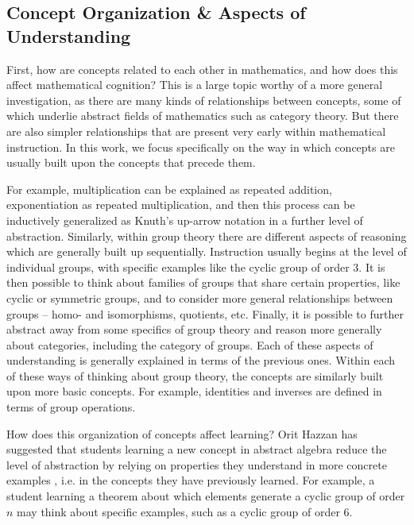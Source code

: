 \documentclass[man,10pt]{apa6}
\begin{document}
\subsection{Concept Organization \& Aspects of Understanding} %
First, how are concepts related to each other in mathematics, and how does this affect mathematical cognition? This is a large topic worthy of a more general investigation, as there are many kinds of relationships between concepts, some of which underlie abstract fields of mathematics such as category theory. But there are also simpler relationships that are present very early within mathematical instruction. In this work, we focus specifically on the way in which concepts are usually built upon the concepts that precede them. \par
For example, multiplication can be explained as repeated addition, exponentiation as repeated multiplication, and then this process can be inductively generalized as Knuth's up-arrow notation in a further level of abstraction. Similarly, within group theory there are different aspects of reasoning which are generally built up sequentially. Instruction usually begins at the level of individual groups, with specific examples like the cyclic group of order 3. It is then possible to think about families of groups that share certain properties, like cyclic or symmetric groups, and to consider more general relationships between groups -- homo- and isomorphisms, quotients, etc. Finally, it is possible to further abstract away from some specifics of group theory and reason more generally about categories, including the category of groups. Each of these aspects of understanding is generally explained in terms of the previous ones. Within each of these ways of thinking about group theory, the concepts are similarly built upon more basic concepts. For example, identities and inverses are defined in terms of group operations.\par
How does this organization of concepts affect learning? Orit Hazzan has suggested that students learning a new concept in abstract algebra reduce the level of abstraction by relying on properties they understand in more concrete examples \cite{Hazzan1999}, i.e. in the concepts they have previously learned. For example, a student learning a theorem about which elements generate a cyclic group of order $n$ may think about specific examples, such as a cyclic group of order 6.\par 
\end{document}
